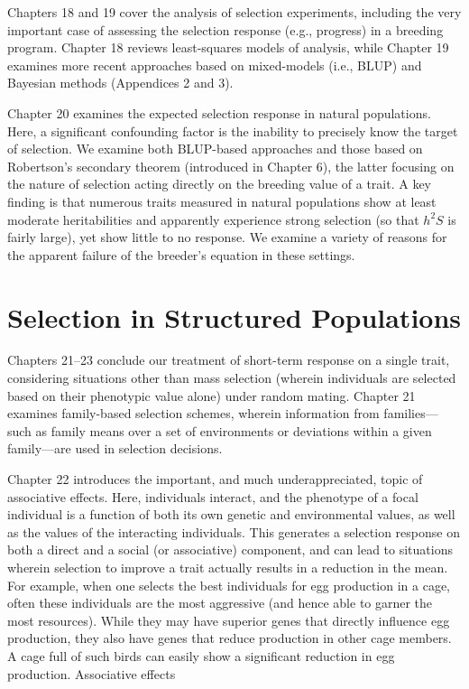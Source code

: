 \documentclass{article}
\begin{document}
Chapters 18 and 19 cover the analysis of selection experiments, including the very important case of assessing the selection response (e.g., progress) in a breeding program. Chapter 18 reviews least-squares models of analysis, while Chapter 19 examines more recent approaches based on mixed-models (i.e., BLUP) and Bayesian methods (Appendices 2 and 3).

Chapter 20 examines the expected selection response in natural populations. Here, a significant confounding factor is the inability to precisely know the target of selection. We examine both BLUP-based approaches and those based on Robertson's secondary theorem (introduced in Chapter 6), the latter focusing on the nature of selection acting directly on the breeding value of a trait. A key finding is that numerous traits measured in natural populations show at least moderate heritabilities and apparently experience strong selection (so that  $ h^{2}S $ is fairly large), yet show little to no response. We examine a variety of reasons for the apparent failure of the breeder's equation in these settings.

\section{Selection in Structured Populations}
Chapters 21–23 conclude our treatment of short-term response on a single trait, considering situations other than mass selection (wherein individuals are selected based on their phenotypic value alone) under random mating. Chapter 21 examines family-based selection schemes, wherein information from families—such as family means over a set of environments or deviations within a given family—are used in selection decisions.

Chapter 22 introduces the important, and much underappreciated, topic of associative effects. Here, individuals interact, and the phenotype of a focal individual is a function of both its own genetic and environmental values, as well as the values of the interacting individuals. This generates a selection response on both a direct and a social (or associative) component, and can lead to situations wherein selection to improve a trait actually results in a reduction in the mean. For example, when one selects the best individuals for egg production in a cage, often these individuals are the most aggressive (and hence able to garner the most resources). While they may have superior genes that directly influence egg production, they also have genes that reduce production in other cage members. A cage full of such birds can easily show a significant reduction in egg production. Associative effects
\end{document}
